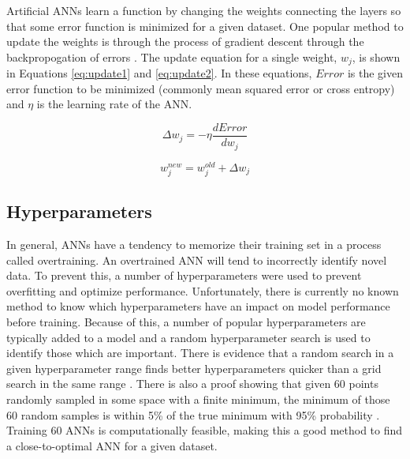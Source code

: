 \documentclass[thesis,tocnosub,noragright,centerchapter,12pt,fullpage]{uiucecethesis09}
\begin{document}
Artificial ANNs learn a function by changing the weights connecting the layers so that some error function is minimized for a given dataset. One popular method to update the weights is through the process of gradient descent through the backpropogation of errors \cite{Rumelhart1986}. The update equation for a single weight, $w_j$, is shown in Equations \ref{eq:update1} and \ref{eq:update2}. In these equations, $Error$ is the given error function to be minimized (commonly mean squared error or cross entropy) and $\eta$ is the learning rate of the ANN.


\begin{equation} \label{eq:update1}
\Delta w_{j} = - \eta \frac{dError}{dw_j}
\end{equation}

\begin{equation} \label{eq:update2}
w^{new}_{j} = w^{old}_{j} + \Delta w_{j}
\end{equation}

\subsection{Hyperparameters}

In general, ANNs have a tendency to memorize their training set in a process called overtraining. An overtrained ANN will tend to incorrectly identify novel data. To prevent this, a number of hyperparameters were used to prevent overfitting and optimize performance. Unfortunately, there is currently no known method to know which hyperparameters have an impact on model performance before training. Because of this, a number of popular hyperparameters are typically added to a model and a random hyperparameter search is used to identify those which are important. There is evidence that a random search in a given hyperparameter range finds better hyperparameters quicker than a grid search in the same range \cite{Bergstra2012}. There is also a proof showing that given 60 points randomly sampled in some space with a finite minimum, the minimum of those 60 random samples is within 5\% of the true minimum with 95\% probability \cite{Zheng2015}. Training 60 ANNs is computationally feasible, making this a good method to find a close-to-optimal ANN for a given dataset. 
\end{document}
